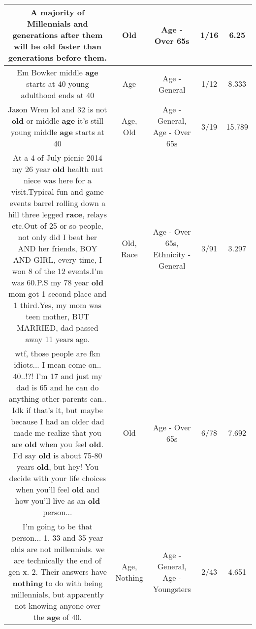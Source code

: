 \documentclass[11pt]{article}
\newlength\mylength
\begin{document}
\begin{center}
\begin{longtable}{|C{.65\mylength}|C{.30\mylength}|C{.12\mylength}|C{.12\mylength}|C{.12\mylength}|}
  \small A majority of Millennials and generations after them will be \textbf{old} faster than generations before them.\normalsize   & Old & Age - Over 65s & 1/16 & 6.25 \\  \hline
  \small Em Bowker middle \textbf{age} starts at 40 young adulthood ends at 40\normalsize   & Age & Age - General & 1/12 & 8.333 \\  \hline
  \small Jason Wren lol and 32 is not \textbf{old} or middle \textbf{age} it's still young middle \textbf{age} starts at 40\normalsize   & Age, Old & Age - General, Age - Over 65s & 3/19 & 15.789 \\  \hline
  \small At a 4 of July picnic 2014 my 26 year \textbf{old} health nut niece was here for a visit.Typical fun and game events barrel rolling down a hill three legged \textbf{race},  relays  etc.Out of 25 or so people, not only did I beat her AND her friends, BOY AND GIRL, every time, I won 8 of the 12 events.I'm was 60.P.S my 78 year \textbf{old} mom got 1 second place and 1 third.Yes, my mom was teen mother, BUT MARRIED, dad passed away 11 years ago.\normalsize   & Old, Race & Age - Over 65s, Ethnicity - General & 3/91 & 3.297 \\  \hline
  \small wtf, those people are fkn idiots... I mean come on.. 40..!?! I'm 17 and just my dad is 65 and he can do anything other parents can.. Idk if that's it, but maybe because I had an older dad made me realize that you are \textbf{old} when you feel \textbf{old}. I'd say \textbf{old} is about 75-80 years \textbf{old}, but hey! You decide with your life choices when you'll feel \textbf{old} and how you'll live as an \textbf{old} person...\normalsize   & Old & Age - Over 65s & 6/78 & 7.692 \\  \hline
  \small I'm going to be that person... 1. 33 and 35 year olds are not millennials. we are technically the end of gen x. 2. Their answers have \textbf{nothing} to do with being millennials, but apparently not knowing anyone over the \textbf{age} of 40.\normalsize   & Age, Nothing & Age - General, Age - Youngsters & 2/43 & 4.651 \\  \hline

\end{longtable}
\end{center}
\end{document}
